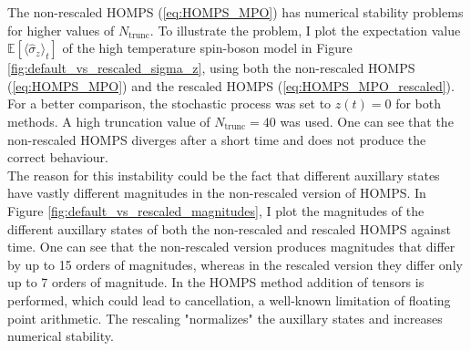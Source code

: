 The non-rescaled HOMPS (\ref{eq:HOMPS_MPO}) has numerical stability problems for higher values of $N_\text{trunc}$. To illustrate the problem,
I plot the expectation value $\mathbb{E}\left\lbrack\langle\hat{\sigma}_z\rangle_t\right\rbrack$ of the high temperature spin-boson model in Figure \ref{fig:default_vs_rescaled_sigma_z}, using both
the non-rescaled HOMPS (\ref{eq:HOMPS_MPO}) and the rescaled HOMPS (\ref{eq:HOMPS_MPO_rescaled}). For a better comparison, the stochastic process
was set to $z(t) = 0$ for both methods. A high truncation value of $N_\text{trunc}=40$ was used. One can see that the non-rescaled HOMPS diverges
after a short time and does not produce the correct behaviour. \\

\newline
\noindent The reason for this instability could be the fact that different auxillary states have vastly different magnitudes in the non-rescaled
version of HOMPS. In Figure \ref{fig:default_vs_rescaled_magnitudes}, I plot the magnitudes of the different auxillary states of both the non-rescaled and rescaled HOMPS against 
time. One can see that the non-rescaled version produces magnitudes that differ by up to 15 orders of magnitudes, whereas in the rescaled
version they differ only up to 7 orders of magnitude. In the HOMPS method addition of tensors is performed, which could lead to cancellation,
a well-known limitation of floating point arithmetic. The rescaling "normalizes" the auxillary states and increases numerical stability. 
